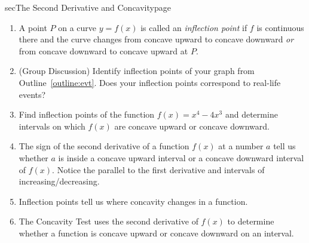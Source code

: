 \documentclass[../main]{subfiles}
\begin{document}
\begin{outline}{sec}{The Second Derivative and Concavity}{page}
\begin{enumerate}
    \item A point \(P\) on a curve \(y = f(x)\) is called an \emph{inflection point} if \(f\) is continuous there and the curve changes from concave upward to concave downward \emph{or} from concave downward to concave upward at \(P\).
    \item (Group Discussion) Identify inflection points of your graph from Outline~\ref{outline:evt}. Does your inflection points correspond to real-life events?
    \item Find inflection points of the function \(f(x) = x^{4} - 4x^{3}\) and determine intervals on which \(f(x)\) are concave upward or concave downward.
    \item {The sign of the second derivative of a function \(f(x)\) at a number \(a\) tell us whether \(a\) is inside a concave upward interval or a concave downward interval of \(f(x)\). Notice the parallel to the first derivative and intervals of increasing/decreasing.}
    \item {Inflection points tell us where concavity changes in a function.}
    \item {The Concavity Test uses the second derivative of \(f(x)\) to determine whether a function is concave upward or concave downward on an interval.}
  \end{enumerate}
\end{outline}
\end{document}
